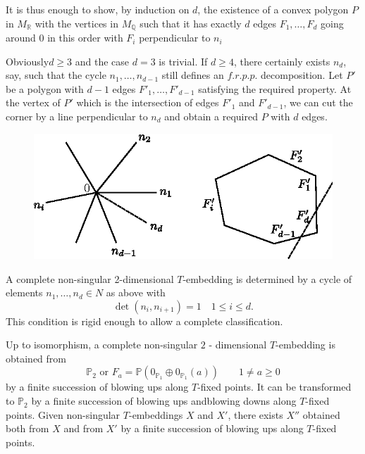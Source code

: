    It is thus enough to show, by induction on $d$, the existence of a
   convex polygon $P$ in $M_\mathbb{R}$ with the vertices in
   $M_\mathbb{Q}$ such that it has exactly $d$ edges $F_1, \ldots ,
   F_d$ going around 0 in this order with $F_i$ perpendicular to
   $n_i$ 
   
   Obviously\pageoriginale $d \geq 3$ and the case $d=3$ is
   trivial. If $d \geq 4$, 
   there certainly exists $n_d$, say, such that the cycle $n_1, \ldots
   , n_{d-1}$ still defines an $f.r.p.p$. decomposition. Let $P'$ be a
   polygon with $d-1$ edges $F'_1, \ldots , F'_{d-1}$ satisfying the
   required property. At the vertex of $P'$ which is the intersection
   of edges $F'_1$ and $F'_{d-1}$, we can cut the corner by a line
   perpendicular to $n_d$ and obtain a required $P$ with $d$ edges. 
\begin{figure}[H]
\centering 
\includegraphics{vol58-fig/fig58-13.eps} 
\end{figure}

   A complete non-singular 2-dimensional $T$-embedding is determined
   by a cycle of elements $n_1, \ldots , n_d \in N$ as above with  
   $$
   \det(n_i, n_{i+1}) =1 \quad 1 \le i \le d. 
   $$ 
   This condition is rigid enough to allow a complete classification. 

\setcounter{theorem}{1}   
   \begin{theorem}\label{chap1:thm8.2}%
Up to isomorphism, a complete non-singular $2$ - dimensional
$T$-embedding is obtained from  
$$
\mathbb{P}_2  \text{ or } F_a = \mathbb{P}(0_{\mathbb{P}_1} \oplus
0_{\mathbb{P}_1} (a)) \qquad 1 \neq a \geq 0 
$$
by a finite succession of blowing ups along $T$-fixed points. It can
be transformed to $\mathbb{P}_2$ by a finite succession of blowing ups
and\pageoriginale blowing downs along $T$-fixed points. Given non-singular
$T$-embeddings $X$ and $X'$, there exists $X''$ obtained both from $X$
and from $X'$ by a finite succession of blowing ups along $T$-fixed
points. 
   \end{theorem}   
 
